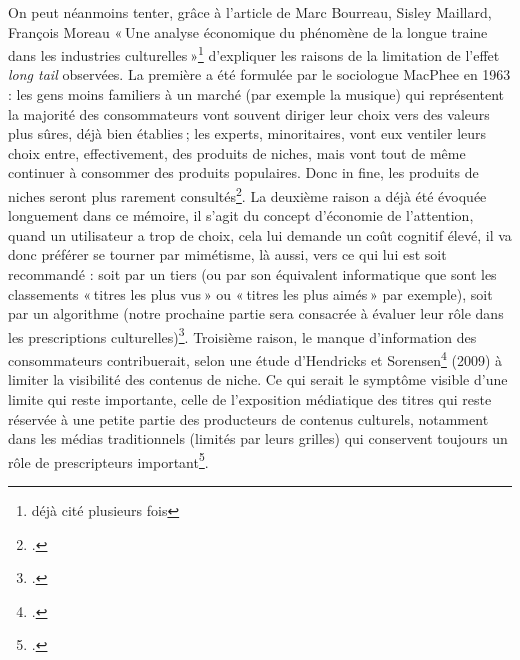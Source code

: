 On peut néanmoins tenter, grâce à l’article de Marc Bourreau, Sisley Maillard, François Moreau « Une analyse économique du phénomène de la longue traine dans les industries culturelles »\footnote{déjà cité plusieurs fois} d’expliquer les raisons de la limitation de l’effet \textit{long tail} observées. La première a été formulée par le sociologue MacPhee en 1963 : les gens moins familiers à un marché (par exemple la musique) qui représentent la majorité des consommateurs vont souvent diriger leur choix vers des valeurs plus sûres, déjà bien établies ; les experts, minoritaires, vont eux ventiler leurs choix entre, effectivement, des produits de niches, mais vont tout de même continuer à consommer des produits populaires. Donc in fine, les produits de niches seront plus rarement consultés\footcite[§ 29]{bourreau2015a}. La deuxième raison a déjà été évoquée longuement dans ce mémoire, il s’agit du concept d’économie de l’attention, quand un utilisateur a trop de choix, cela lui demande un coût cognitif élevé, il va donc préférer se tourner par mimétisme, là aussi, vers ce qui lui est soit recommandé : soit par un tiers (ou par son équivalent informatique que sont les classements « titres les plus vus » ou « titres les plus aimés » par exemple), soit par un algorithme (notre prochaine partie sera consacrée à évaluer leur rôle dans les prescriptions culturelles)\footcite[§ 39]{bourreau2015a}. Troisième raison, le manque d’information des consommateurs contribuerait, selon une étude d’Hendricks et Sorensen\footcite[§ 40]{bourreau2015a} (2009) à limiter la visibilité des contenus de niche. Ce qui serait le symptôme visible d’une limite qui reste importante, celle de l’exposition médiatique des titres qui reste réservée à une petite partie des producteurs de contenus culturels, notamment dans les médias traditionnels (limités par leurs grilles) qui conservent toujours un rôle de prescripteurs important\footcite[§ 41]{bourreau2015a}.

